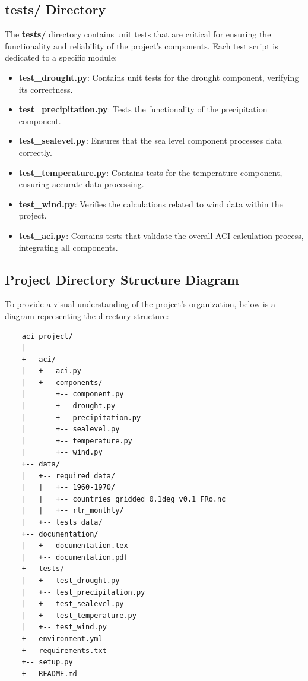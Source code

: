 \documentclass[a4paper,12pt]{article}
\begin{document}
\subsection{tests/ Directory}
The \textbf{tests/} directory contains unit tests that are critical for ensuring the functionality and reliability of the project's components. Each test script is dedicated to a specific module:

\begin{itemize}
    \item \textbf{test\_drought.py}: Contains unit tests for the drought component, verifying its correctness.
    \item \textbf{test\_precipitation.py}: Tests the functionality of the precipitation component.
    \item \textbf{test\_sealevel.py}: Ensures that the sea level component processes data correctly.
    \item \textbf{test\_temperature.py}: Contains tests for the temperature component, ensuring accurate data processing.
    \item \textbf{test\_wind.py}: Verifies the calculations related to wind data within the project.
    \item \textbf{test\_aci.py}: Contains tests that validate the overall ACI calculation process, integrating all components.
\end{itemize}

\subsection{Project Directory Structure Diagram}

To provide a visual understanding of the project's organization, below is a diagram representing the directory structure:

\begin{verbatim}
    aci_project/
    |
    +-- aci/
    |   +-- aci.py
    |   +-- components/
    |       +-- component.py
    |       +-- drought.py
    |       +-- precipitation.py
    |       +-- sealevel.py
    |       +-- temperature.py
    |       +-- wind.py
    +-- data/
    |   +-- required_data/
    |   |   +-- 1960-1970/
    |   |   +-- countries_gridded_0.1deg_v0.1_FRo.nc
    |   |   +-- rlr_monthly/
    |   +-- tests_data/
    +-- documentation/
    |   +-- documentation.tex
    |   +-- documentation.pdf
    +-- tests/
    |   +-- test_drought.py
    |   +-- test_precipitation.py
    |   +-- test_sealevel.py
    |   +-- test_temperature.py
    |   +-- test_wind.py
    +-- environment.yml
    +-- requirements.txt
    +-- setup.py
    +-- README.md

\end{verbatim}
\end{document}
